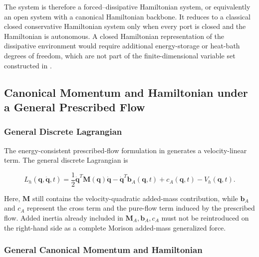 The system is therefore a forced--dissipative Hamiltonian system, or equivalently an open system with a canonical Hamiltonian backbone. It reduces to a classical closed conservative Hamiltonian system only when every port is closed and the Hamiltonian is autonomous. A closed Hamiltonian representation of the dissipative environment would require additional energy-storage or heat-bath degrees of freedom, which are not part of the finite-dimensional variable set constructed in .

\subsection{Canonical Momentum and Hamiltonian under a General Prescribed Flow}\label{sec:hamiltonian-3-5}

\subsubsection{General Discrete Lagrangian}\label{sec:hamiltonian-3-5-1}

The energy-consistent prescribed-flow formulation in  generates a velocity-linear term. The general discrete Lagrangian is\cite{MarsdenRatiu1999MechanicsSymmetry,Arnold1989ClassicalMechanics}

\begin{equation}
\label{eq:hamiltonian-3-42}
\boxed{L_{h}\left( \mathbf{q},\dot{\mathbf{q}},t \right) = \frac{1}{2}{\dot{\mathbf{q}}}^{T}\mathbf{M}\left( \mathbf{q} \right)\dot{\mathbf{q}} - {\dot{\mathbf{q}}}^{T}\mathbf{b}_{A}\left( \mathbf{q},t \right) + c_{A}\left( \mathbf{q},t \right) - V_{h}\left( \mathbf{q},t \right).}
\end{equation}

Here, \(\mathbf{M}\) still contains the velocity-quadratic added-mass contribution, while \(\mathbf{b}_{A}\) and \(c_{A}\) represent the cross term and the pure-flow term induced by the prescribed flow. Added inertia already included in \(\mathbf{M}_{A},\mathbf{b}_{A},c_{A}\) must not be reintroduced on the right-hand side as a complete Morison added-mass generalized force.

\subsubsection{General Canonical Momentum and Hamiltonian}\label{sec:hamiltonian-3-5-2}

